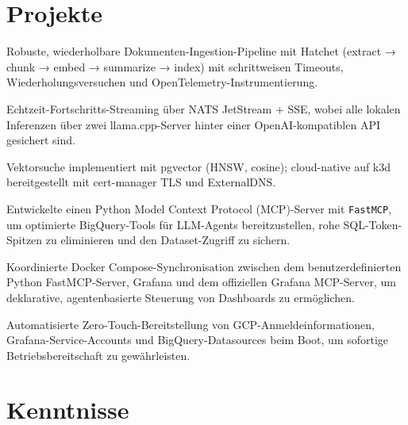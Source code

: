 \documentclass[10pt,a4paper]{resume}
\begin{document}
\vspace{2pt}

\section{Projekte}

\bullets
  \item Robuste, wiederholbare Dokumenten-Ingestion-Pipeline mit Hatchet (extract → chunk → embed → summarize → index) mit schrittweisen Timeouts, Wiederholungsversuchen und OpenTelemetry-Instrumentierung.
  \item Echtzeit-Fortschritts-Streaming über NATS JetStream + SSE, wobei alle lokalen Inferenzen über zwei llama.cpp-Server hinter einer OpenAI-kompatiblen API gesichert sind.
  \item Vektorsuche implementiert mit pgvector (HNSW, cosine); cloud-native auf k3d bereitgestellt mit cert-manager TLS und ExternalDNS.
\bulletsend
\vspace{1.0pt}
\bullets
  \item Entwickelte einen Python Model Context Protocol (MCP)-Server mit \texttt{FastMCP}, um optimierte BigQuery-Tools für LLM-Agents bereitzustellen, rohe SQL-Token-Spitzen zu eliminieren und den Dataset-Zugriff zu sichern.
  \item Koordinierte Docker Compose-Synchronisation zwischen dem benutzerdefinierten Python FastMCP-Server, Grafana und dem offiziellen Grafana MCP-Server, um deklarative, agentenbasierte Steuerung von Dashboards zu ermöglichen.
  \item Automatisierte Zero-Touch-Bereitstellung von GCP-Anmeldeinformationen, Grafana-Service-Accounts und BigQuery-Datasources beim Boot, um sofortige Betriebsbereitschaft zu gewährleisten.
\bulletsend

\section{Kenntnisse}
\end{document}
